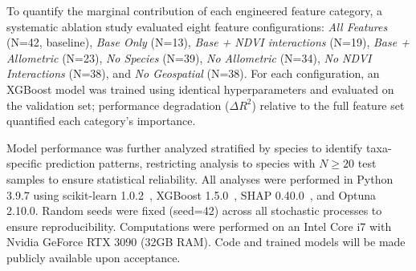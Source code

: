 To quantify the marginal contribution of each engineered feature category, a systematic ablation study evaluated eight feature configurations: \textit{All Features} (N=42, baseline), \textit{Base Only} (N=13), \textit{Base + NDVI interactions} (N=19), \textit{Base + Allometric} (N=23), \textit{No Species} (N=39), \textit{No Allometric} (N=34), \textit{No NDVI Interactions} (N=38), and \textit{No Geospatial} (N=38). For each configuration, an XGBoost model was trained using identical hyperparameters and evaluated on the validation set; performance degradation ($\Delta R^2$) relative to the full feature set quantified each category's importance.

Model performance was further analyzed stratified by species to identify taxa-specific prediction patterns, restricting analysis to species with $N \geq 20$ test samples to ensure statistical reliability. All analyses were performed in Python 3.9.7 using scikit-learn 1.0.2~\cite{pedregosaScikitlearnMachineLearning2011}, XGBoost 1.5.0~\cite{chenXGBoostScalableTree2016}, SHAP 0.40.0~\cite{lundbergUnifiedApproachInterpreting2017}, and Optuna 2.10.0. Random seeds were fixed (seed=42) across all stochastic processes to ensure reproducibility. Computations were performed on an Intel Core i7 with Nvidia GeForce RTX 3090 (32GB RAM). Code and trained models will be made publicly available upon acceptance.

